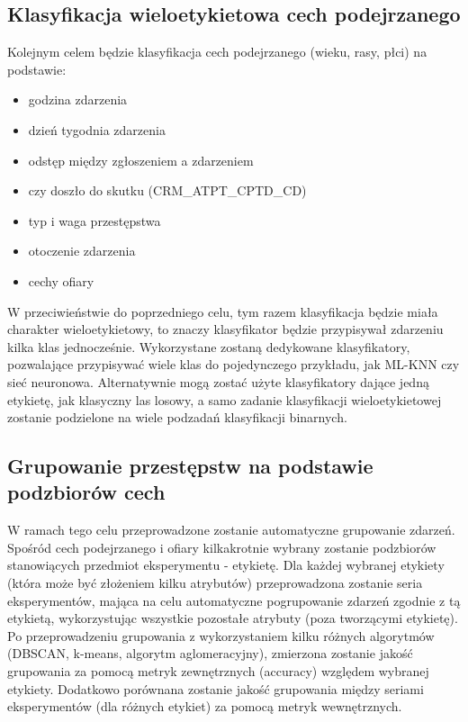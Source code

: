 \documentclass{classrep}
\begin{document}
{        \subsection{Klasyfikacja wieloetykietowa cech podejrzanego}
        \label{project_goal_2} {

            Kolejnym celem będzie klasyfikacja cech podejrzanego (wieku, rasy, płci) na
            podstawie:
            \begin{itemize}
                \item godzina zdarzenia
                \item dzień tygodnia zdarzenia
                \item odstęp między zgłoszeniem a zdarzeniem
                \item czy doszło do skutku (CRM\_ATPT\_CPTD\_CD)
                \item typ i waga przestępstwa
                \item otoczenie zdarzenia
                \item cechy ofiary
            \end{itemize}
            W przeciwieństwie do poprzedniego celu, tym razem klasyfikacja będzie miała
            charakter wieloetykietowy, to znaczy klasyfikator będzie przypisywał
            zdarzeniu kilka klas jednocześnie. Wykorzystane zostaną dedykowane
            klasyfikatory, pozwalające przypisywać wiele klas do pojedynczego
            przykładu, jak ML-KNN czy sieć neuronowa. Alternatywnie mogą zostać użyte
            klasyfikatory dające jedną etykietę, jak klasyczny las losowy, a samo
            zadanie klasyfikacji wieloetykietowej zostanie podzielone na wiele podzadań
            klasyfikacji binarnych.
        }

        \subsection{Grupowanie przestępstw na podstawie podzbiorów cech}
        \label{project_goal_3} {
            W ramach tego celu przeprowadzone zostanie automatyczne grupowanie zdarzeń.
            Spośród cech podejrzanego i ofiary kilkakrotnie wybrany zostanie podzbiorów
            stanowiących przedmiot eksperymentu - etykietę. Dla każdej wybranej
            etykiety (która może być złożeniem kilku atrybutów) przeprowadzona zostanie
            seria eksperymentów, mająca na celu automatyczne pogrupowanie zdarzeń
            zgodnie z tą etykietą, wykorzystując wszystkie pozostałe atrybuty (poza
            tworzącymi etykietę). Po przeprowadzeniu grupowania z wykorzystaniem kilku
            różnych algorytmów (DBSCAN, k-means, algorytm aglomeracyjny), zmierzona
            zostanie jakość grupowania za pomocą metryk zewnętrznych (accuracy)
            względem wybranej etykiety. Dodatkowo porównana zostanie jakość grupowania
            między seriami eksperymentów (dla różnych etykiet) za pomocą metryk
            wewnętrznych.
        }

    }
\end{document}
